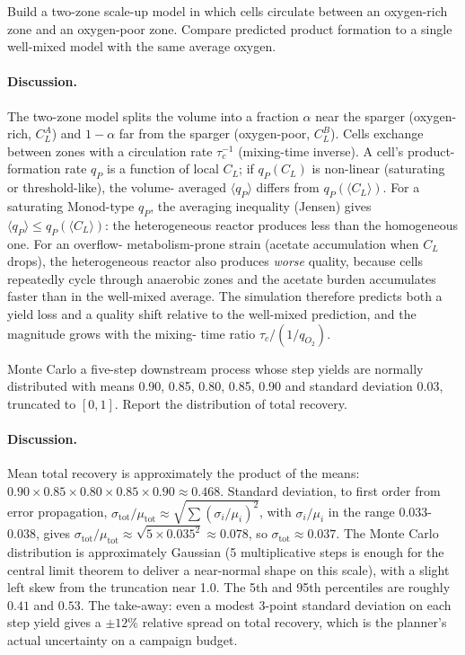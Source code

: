 \begin{exercise}
Build a two-zone scale-up model in which cells circulate between an
oxygen-rich zone and an oxygen-poor zone. Compare predicted product
formation to a single well-mixed model with the same average oxygen.
\end{exercise}

\paragraph{Discussion.}
The two-zone model splits the volume into a fraction $\alpha$ near
the sparger (oxygen-rich, $C_L^A$) and $1 - \alpha$ far from the
sparger (oxygen-poor, $C_L^B$). Cells exchange between zones with a
circulation rate $\tau_c^{-1}$ (mixing-time inverse). A cell's
product-formation rate $q_P$ is a function of local $C_L$; if
$q_P(C_L)$ is non-linear (saturating or threshold-like), the volume-
averaged $\langle q_P \rangle$ differs from $q_P(\langle C_L \rangle)$.
For a saturating Monod-type $q_P$, the averaging inequality (Jensen) gives
$\langle q_P \rangle \le q_P(\langle C_L \rangle)$: the heterogeneous
reactor produces less than the homogeneous one. For an overflow-
metabolism-prone strain (acetate accumulation when $C_L$ drops), the
heterogeneous reactor also produces \emph{worse} quality, because
cells repeatedly cycle through anaerobic zones and the acetate burden
accumulates faster than in the well-mixed average. The simulation
therefore predicts both a yield loss and a quality shift relative to
the well-mixed prediction, and the magnitude grows with the mixing-
time ratio $\tau_c / (1/q_{O_2})$.

\begin{exercise}
Monte Carlo a five-step downstream process whose step yields are
normally distributed with means 0.90, 0.85, 0.80, 0.85, 0.90 and
standard deviation 0.03, truncated to $[0,1]$. Report the distribution
of total recovery.
\end{exercise}

\paragraph{Discussion.}
Mean total recovery is approximately the product of the means:
$0.90 \times 0.85 \times 0.80 \times 0.85 \times 0.90 \approx 0.468$.
Standard deviation, to first order from error propagation,
$\sigma_{\text{tot}}/\mu_{\text{tot}} \approx \sqrt{\sum (\sigma_i/\mu_i)^2}$,
with $\sigma_i/\mu_i$ in the range 0.033-0.038, gives
$\sigma_{\text{tot}}/\mu_{\text{tot}} \approx \sqrt{5 \times 0.035^2}
\approx 0.078$, so $\sigma_{\text{tot}} \approx 0.037$. The Monte
Carlo distribution is approximately Gaussian (5 multiplicative steps
is enough for the central limit theorem to deliver a near-normal
shape on this scale), with a slight left skew from the truncation
near 1.0. The 5th and 95th percentiles are roughly
$0.41$ and $0.53$. The take-away: even a modest 3-point standard
deviation on each step yield gives a $\pm 12\%$ relative spread on
total recovery, which is the planner's actual uncertainty on a
campaign budget.

